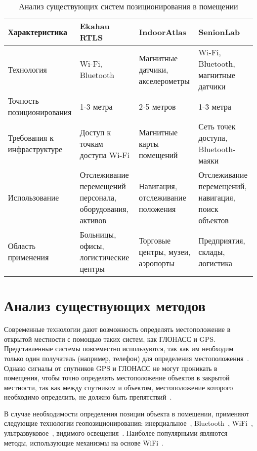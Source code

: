 \begin{table}[H]
    \caption{Анализ существующих систем позиционирования в помещении}
    \centering
    \begin{tabular}{|m{7 em}|m{8em}|m{8em}|m{8em}|}
        \hline
        Характеристика & Ekahau RTLS & IndoorAtlas & SenionLab \\
        \hline
        Технология & Wi-Fi, Bluetooth & Магнитные датчики, акселерометры & Wi-Fi, Bluetooth, магнитные датчики \\
        \hline
        Точность позиционирования & 1-3 метра & 2-5 метров & 1-3 метра \\
        \hline
        Требования к инфраструктуре & Доступ к точкам доступа Wi-Fi & Магнитные карты помещений & Сеть точек доступа, Bluetooth-маяки \\
        \hline
        Использование & Отслеживание перемещений персонала, оборудования, активов & Навигация, отслеживание положения & Отслеживание перемещений, навигация, поиск объектов \\
        \hline
        Область применения & Больницы, офисы, логистические центры & Торговые центры, музеи, аэропорты & Предприятия, склады, логистика \\
        \hline
      \end{tabular}
\end{table}

\clearpage

\section{Анализ существующих методов}

Современные технологии дают возможность определять местоположение в открытой местности с помощью таких систем, как ГЛОНАСС и GPS. Представленные системы повсеместно используются, так как им необходим только один получатель (например, телефон) для определения местоположения~\cite{trends}. Однако сигналы от спутников GPS и ГЛОНАСС не могут проникать в помещения, чтобы точно определять местоположение объектов в закрытой местности, так как между спутником и объектом, местоположение которого необходимо определить, не должно быть препятствий~\cite{IGS}. 

В случае необходимости определения позиции объекта в помещении, применяют следующие технологии геопозиционирования: инерциальное~\cite{inertial}, Bluetooth~\cite{bluetooth}, WiFi~\cite{wifi}, ультразвуковое~\cite{ultrasound}, видимого освещения~\cite{light}. Наиболее популярными являются методы, использующие механизмы на основе WiFi~\cite{trends}.

